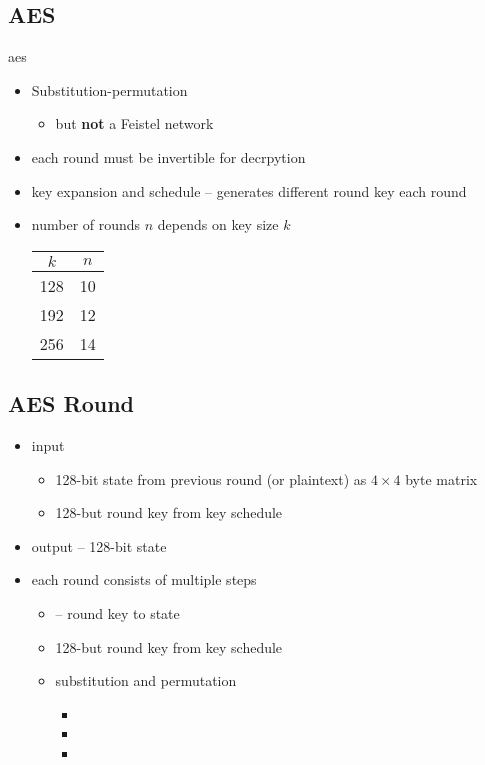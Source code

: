 \documentclass[draft]{article}
\begin{document}
\begin{multicols}{2}
    \subsection{AES}
    \acrfull{aes}
    \begin{itemize}[nosep]
        \item Substitution-permutation
              \begin{itemize}[nosep]\item but \textbf{not} a Feistel network\end{itemize}
        \item each round must be invertible for decrpytion
        \item key expansion and schedule -- generates different round key each round
        \item number of rounds $n$ depends on key size $k$

              \begin{tabular}{cc}
                  $k$ & $n$ \\\toprule
                  128 & 10  \\
                  192 & 12  \\
                  256 & 14  \\\bottomrule
              \end{tabular}
    \end{itemize}
    \subsection{AES Round}
    \begin{itemize}[nosep]
        \item input
              \begin{itemize}[nosep]
                  \item 128-bit state from previous round (or plaintext) as $4\times4$ byte matrix
                  \item 128-but round key from key schedule
              \end{itemize}
        \item output -- 128-bit state
        \item each round consists of multiple steps
              \begin{itemize}[nosep]
                  \item {} --  round key to state
                  \item 128-but round key from key schedule
                  \item substitution and permutation
                        \begin{itemize}[nosep]
                            \item {}
                            \item {}
                            \item {}
                        \end{itemize}
              \end{itemize}
    \end{itemize}
\end{multicols}
\end{document}
